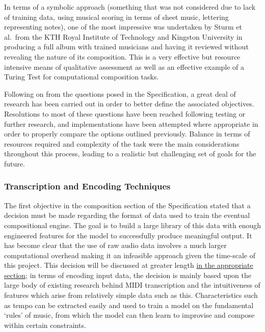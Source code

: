 \documentclass[12pt,]{article}
\begin{document}
In terms of a symbolic approach (something that was not considered due
to lack of training data, using musical scoring in terms of sheet music,
lettering representing notes), one of the most impressive was undertaken
by Sturm et al.~from the KTH Royal Institute of Technology and Kingston
University in producing a full album with trained musicians and having
it reviewed without revealing the nature of its composition. This is a
very effective but resource intensive means of qualitative assessment as
well as an effective example of a Turing Test for computational
composition tasks.

Following on from the questions posed in the Specification, a great deal
of research has been carried out in order to better define the
associated objectives. Resolutions to most of these questions have been
reached following testing or further research, and implementations have
been attempted where appropriate in order to properly compare the
options outlined previously. Balance in terms of resources required and
complexity of the task were the main considerations throughout this
process, leading to a realistic but challenging set of goals for the
future.

\hypertarget{transcription-and-encoding-techniques}{%
\subsubsection{Transcription and Encoding
Techniques}\label{transcription-and-encoding-techniques}}

The first objective in the composition section of the Specification
stated that a decision must be made regarding the format of data used to
train the eventual compositional engine. The goal is to build a large
library of this data with enough engineered features for the model to
successfully produce meaningful output. It has become clear that the use
of raw audio data involves a much larger computational overhead making
it an infeasible approach given the time-scale of this project. This
decision will be discussed at greater length
\protect\hyperlink{neuralnetworkapproach}{in the appropriate section};
in terms of encoding input data, the decision is mainly based upon the
large body of existing research behind MIDI transcription and the
intuitiveness of features which arise from relatively simple data such
as this. Characteristics such as tempo can be extracted easily and used
to train a model on the fundamental `rules' of music, from which the
model can then learn to improvise and compose within certain
constraints.
\end{document}
